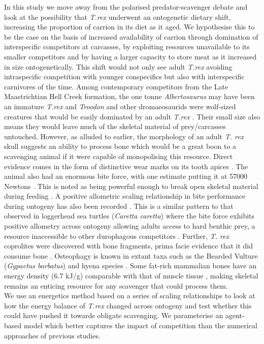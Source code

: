 In this study we move away from the polarised predator-scavenger debate and look at the possibility that \textit{T.rex} underwent an ontogenetic dietary shift, increasing the proportion of carrion in its diet as it aged. We hypothesise this to be the case on the basis of increased availability of carrion through domination of interspecific competitors at carcasses, by exploiting resources unavailable to its smaller competitors and by having a larger capacity to store meat as it increased in size ontogenetically.  This shift would not only see adult \textit{T.rex} avoiding intraspecific competition with younger conspecifics but also with interspecific carnivores of the time. Among contemporary competitors from the Late Maastrichtian Hell Creek formation, the one tonne \textit{Albertosaurus} may have been an immature \textit{T.rex} and \textit{Troodon} and other dromaeosaurids were wolf-sized creatures that would be easily dominated by an adult \textit{T.rex} \citep{horner2011dinosaur,carr2004diversity,farlow2002body}. Their small size also means they would leave much of the skeletal material of prey/carcasses untouched. 
However, as alluded to earlier, the morphology of an adult \textit{T. rex} skull suggests an ability to process bone which would be a great boon to a scavenging animal if it were capable of monopolising this resource. Direct evidence comes in the form of distinctive wear marks on its tooth apices \citep{farlow1994wear,schubert2005wear}. The animal also had an enormous bite force, with one estimate putting it at 57000 Newtons \citep{bates2012estimating}. This is noted as being powerful enough to break open skeletal material during feeding \citep{rayfield2001cranial}. A positive allometric scaling relationship in bite performance during ontogeny has also been recorded \citep{bates2012estimating}. This is a similar pattern to that observed in loggerhead sea turtles (\textit{Caretta caretta}) where the bite force exhibits positive allometry across ontogeny allowing adults access to hard benthic prey, a resource inaccessible to other durophagous competitors \citep{marshall2012ontogenetic}. Further, \textit{T. rex} coprolites were discovered with bone fragments, prima facie evidence that it did consume bone \citep{chin2003remarkable}. Osteophagy is known in extant taxa such as the Bearded Vulture (\textit{Gypaetus barbatus}) and hyena species \citep{hone2010feeding}.  Some fat-rich mammalian bones have an energy density (6.7 kJ/g) comparable with that of muscle tissue \citep{margalida2008bearded,brown1989study}, making skeletal remains an enticing resource for any scavenger that could process them.  \\
\indent
We use an energetics method based on a series of scaling relationships to look at how the energy balance of \textit{T.rex} changed across ontogeny and test whether this could have pushed it towards obligate scavenging. We parameterise an agent-based model which better captures the impact of competition than the numerical approaches of previous studies. 

